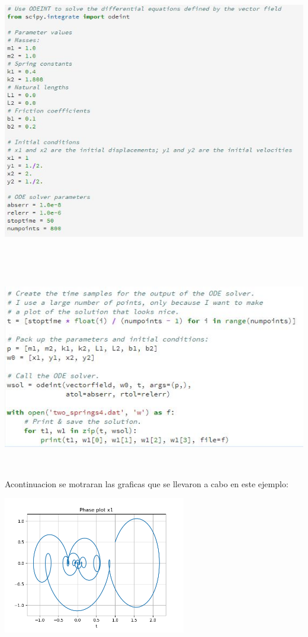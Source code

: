 \documentclass{article}
\begin{document}
\begin{center}
\includegraphics[height=12cm]{cod6.png}
\end{center}

\begin{center}
\includegraphics[height=9cm]{cod6_1.png}
\end{center}

Acontinuacion se motraran las graficas que se llevaron a cabo en este ejemplo:
\begin{center}
\includegraphics[height=6cm]{resortes2_4_1.png}
\end{center}
\end{document}

